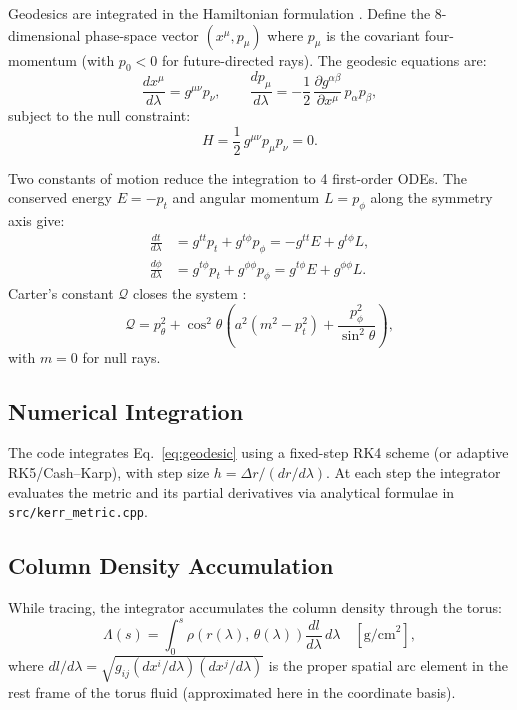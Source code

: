 \documentclass[11pt,a4paper]{article}
\begin{document}
Geodesics are integrated in the Hamiltonian formulation \cite{MTW, Fuerst2004}. Define the 8-dimensional phase-space vector $(x^\mu, p_\mu)$ where $p_\mu$ is the covariant four-momentum (with $p_0 < 0$ for future-directed rays). The geodesic equations are:
\begin{equation}
  \frac{dx^\mu}{d\lambda} = g^{\mu\nu} p_\nu,
  \qquad
  \frac{dp_\mu}{d\lambda} = -\frac{1}{2}\,\frac{\partial g^{\alpha\beta}}{\partial x^\mu}\,p_\alpha p_\beta,
  \label{eq:geodesic}
\end{equation}
subject to the null constraint:
\begin{equation}
  H = \frac{1}{2}\,g^{\mu\nu} p_\mu p_\nu = 0.
  \label{eq:null}
\end{equation}

Two constants of motion reduce the integration to 4 first-order ODEs. The conserved energy $E = -p_t$ and angular momentum $L = p_\phi$ along the symmetry axis give:
\begin{align}
  \frac{dt}{d\lambda} &= g^{tt}p_t + g^{t\phi}p_\phi = -g^{tt}E + g^{t\phi}L,\\
  \frac{d\phi}{d\lambda} &= g^{t\phi}p_t + g^{\phi\phi}p_\phi = g^{t\phi}E + g^{\phi\phi}L.
\end{align}
Carter's constant $\mathcal{Q}$ closes the system \cite{Carter1968}:
\begin{equation}
  \mathcal{Q} = p_\theta^2 + \cos^2\theta\left(a^2(m^2 - p_t^2) + \frac{p_\phi^2}{\sin^2\theta}\right),
\end{equation}
with $m = 0$ for null rays.

\subsection{Numerical Integration}

The code integrates Eq.~\eqref{eq:geodesic} using a fixed-step RK4 scheme (or adaptive RK5/Cash--Karp), with step size $h = \Delta r / (dr/d\lambda)$. At each step the integrator evaluates the metric and its partial derivatives via analytical formulae in \texttt{src/kerr\_metric.cpp}.

\subsection{Column Density Accumulation}

While tracing, the integrator accumulates the column density through the torus:
\begin{equation}
  \Lambda(s) = \int_0^s \rho\!\left(r(\lambda),\,\theta(\lambda)\right) \frac{dl}{d\lambda}\,d\lambda \quad [\mathrm{g/cm}^2],
  \label{eq:column}
\end{equation}
where $dl/d\lambda = \sqrt{g_{ij}(dx^i/d\lambda)(dx^j/d\lambda)}$ is the proper spatial arc element in the rest frame of the torus fluid (approximated here in the coordinate basis).
\end{document}
